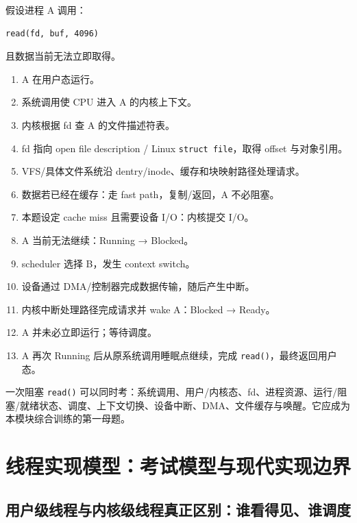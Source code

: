 \documentclass[11pt,a4paper]{ctexart}
\newcommand{\code}[1]{\texttt{#1}}
\begin{document}
假设进程 A 调用：
\begin{verbatim}
read(fd, buf, 4096)
\end{verbatim}
且数据当前无法立即取得。

\begin{enumerate}
\item A 在用户态运行。
\item 系统调用使 CPU 进入 A 的内核上下文。
\item 内核根据 fd 查 A 的文件描述符表。
\item fd 指向 open file description / Linux \code{struct file}，取得 offset 与对象引用。
\item VFS/具体文件系统沿 dentry/inode、缓存和块映射路径处理请求。
\item 数据若已经在缓存：走 fast path，复制/返回，A 不必阻塞。
\item 本题设定 cache miss 且需要设备 I/O：内核提交 I/O。
\item A 当前无法继续：Running → Blocked。
\item scheduler 选择 B，发生 context switch。
\item 设备通过 DMA/控制器完成数据传输，随后产生中断。
\item 内核中断处理路径完成请求并 wake A：Blocked → Ready。
\item A 并未必立即运行；等待调度。
\item A 再次 Running 后从原系统调用睡眠点继续，完成 \code{read()}，最终返回用户态。
\end{enumerate}

\begin{exam}[一题串起的考点]
一次阻塞 \code{read()} 可以同时考：系统调用、用户/内核态、fd、进程资源、运行/阻塞/就绪状态、调度、上下文切换、设备中断、DMA、文件缓存与唤醒。它应成为本模块综合训练的第一母题。
\end{exam}

\section{线程实现模型：考试模型与现代实现边界}

\subsection{用户级线程与内核级线程真正区别：谁看得见、谁调度}
\end{document}
